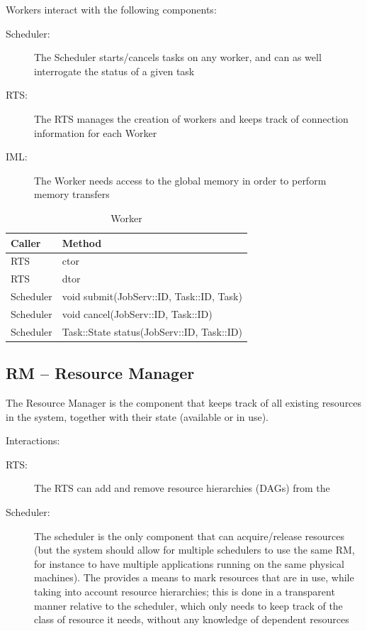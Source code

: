 \documentclass[10pt]{article}
\newcommand{\rts}{RTS\xspace}
\newcommand{\sched}{Scheduler\xspace}
\newcommand{\worker}{Worker\xspace}
\newcommand{\workers}{Workers\xspace}
\newcommand{\rman}{RM\xspace}
\newcommand{\iml}{IML\xspace}
\newcommand{\js}{JobServ\xspace}
\newcommand{\task}{Task\xspace}
\newcommand{\id}{::ID\xspace}
\begin{document}
\workers interact with the following components:
\begin{description}
    \item [\sched:] The \sched starts/cancels tasks on any worker, and can as
    well interrogate the status of a given task
    \item [\rts:] The \rts manages the creation of workers and keeps track of
    connection information for each \worker
    \item [\iml:] The \worker needs access to the global memory in order to
    perform memory transfers
\end{description}

%
\begin{table}[ht]
    \centering
    \caption{Worker}
    \label{tab:worker}
    \bgroup
    \setlength{\tabcolsep}{2em}
    \begin{tabular}{ll}
        \toprule
        Caller & Method \\
        \midrule
        \rts & ctor \\
        \rts & dtor \\
        \sched & void submit(\js\id, \task\id, \task)  \\
        \sched & void cancel(\js\id, \task\id) \\
        \sched & \task::State status(\js\id, \task\id) \\
        \bottomrule
    \end{tabular}
    \egroup
\end{table}
%


\subsection{RM -- Resource Manager}

The Resource Manager is the component that keeps track of all existing resources in the system, together with their state (available or in use). 

Interactions:
\begin{description}
    \item [\rts:] The \rts can add and remove resource hierarchies (DAGs) from the \rm
    \item [\sched:] The scheduler is the only component that can acquire/release
    resources (but the system should allow for multiple schedulers to use the same
    \rman, for instance to have multiple applications running on the same physical
    machines). The \rm provides a means to mark resources that are in use, while
    taking into account resource hierarchies; this is done in a transparent manner
    relative to the scheduler, which only needs to keep track of the class of
    resource it needs, without any knowledge of dependent resources
\end{description}
\end{document}
